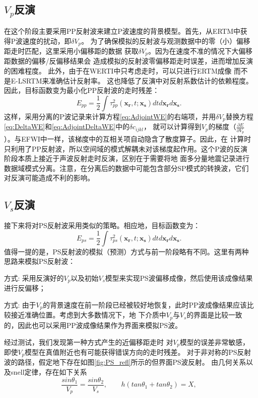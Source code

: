 \subsection{$V_p$反演}
在这个阶段主要采用PP反射波来建立P波速度的背景模型。首先，从ERTM中获得P波速度的扰动，即$\delta V_p$。
为了确保模拟的反射波与观测数据中的零（小）偏移距走时匹配，这里采用小偏移距的数据
获取$\delta V_p$。因为在速度不准的情况下大偏移距数据的偏移/反偏移结果会
造成模拟的反射波零偏移距走时误差，进而增加反演的困难程度。
此外，由于在WERTI中只考虑走时，可以只进行ERTM成像
而不是E-LSRTM来准确估计反射率。
这也降低了反演中对反射系数估计的依赖程度。因此，目标函数变为最小化PP反射波的走时残差：
\begin{equation}
    E_{pp}=\frac{1}{2}\int\tau^2_{pp}(\mathbf{x_r},t;\mathbf{x_s})dtd\mathbf{x_r}d\mathbf{x_s}.
    \label{eq:ObjectivefunctionPP} 
\end{equation}
这样，采用分离的P波记录来计算方程\eqref{eq:AdjointWE}的右端项，并用$\delta V_p$替换方程\eqref{eq:DeltaWE}和\eqref{eq:AdjointDeltaWE}中的$\delta c_{ijkl}$，
就可以计算得到$V_p$的梯度（$\frac{\partial E}{\partial V_p}$）。与EFWI中一样，该梯度中的互相关项自动隐含了散度算子。因此，在
计算时只利用了PP反射波，所以空间域的模式解耦未对该梯度起作用。这个P波的反演阶段本质上接近于声波反射走时反演，区别在于需要将地
面多分量地震记录进行数据域模式分离。注意，在分离后的数据中可能包含部分SP模式的转换波，它们对反演可能造成不利的影响。

\subsection{$V_s$反演}
接下来将对PS反射波采用类似的策略。相应地，目标函数变为：
\begin{equation}
    E_{ps}=\frac{1}{2}\int\tau^2_{ps}(\mathbf{x_r},t;\mathbf{x_s})dtd\mathbf{x_r}d\mathbf{x_s}.
    \label{eq:ObjectivefunctionPS} 
\end{equation}
值得一提的是，PS反射波的模拟（预测）方式与前一阶段略有不同。这里有两种思路来模拟PS反射波：

方式\uppercase\expandafter{}: 采用反演好的$V_p$以及初始$V_s$模型来实现PS波偏移成像，然后使用该成像结果进行反偏移；

方式\uppercase\expandafter{}: 由于$V_p$的背景速度在前一阶段已经被较好地恢复，此时PP波成像结果应该比较接近准确位置。考虑到大多数情况下，地
下介质中$V_p$与$V_s$的界面是比较一致的，因此也可以采用PP波成像结果作为界面来模拟PS波。

经过测试，我们发现第一种方式产生的近偏移距走时
对$V_p$模型的误差非常敏感，即使$V_p$模型在真值附近也有可能获得错误方向的走时残差。
对于非对称的PS反射波的路径，假定地下存在如图\ref{fig:PS_refl}所示的但界面PS波反射。
由几何关系以及snell定律，存在如下关系
\begin{equation}
    \frac{sin\theta_1}{V_p}=\frac{sin\theta_2}{V_s},\qquad
    h(tan\theta_1+tan\theta_2)=X,
    \label{eq:Snell_PS} 
\end{equation}

